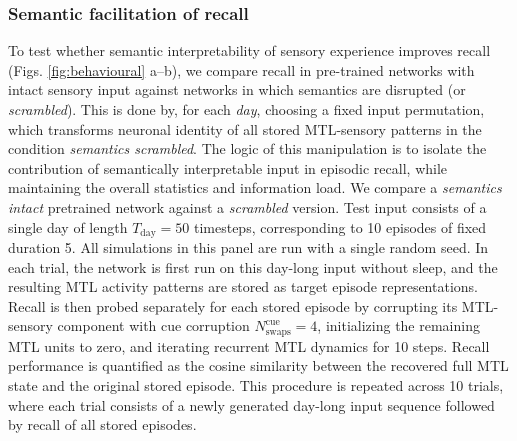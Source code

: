 \documentclass{article}
\begin{document}
\subsubsection*{Semantic facilitation of recall}
To test whether semantic interpretability of sensory experience improves recall   (Figs. \ref{fig:behavioural} a--b), we compare recall in pre-trained networks with intact sensory input against networks in which semantics are disrupted (or \textit{scrambled}). This is done by, for each \textit{day}, choosing a fixed input permutation, which transforms neuronal identity of all stored MTL-sensory patterns in the condition \textit{semantics scrambled}. The logic of this manipulation is to isolate the contribution of semantically interpretable input in episodic recall, while maintaining the overall statistics and information load.
\newline\newline
We compare a \emph{semantics intact} pretrained network against a \emph{scrambled} version. Test input consists of a single day of length $T_\mathrm{day}=50$ timesteps, corresponding to 10 episodes of fixed duration 5. All simulations in this panel are run with a single random seed.
\newline\newline
In each trial, the network is first run on this day-long input without sleep, and the resulting MTL activity patterns are stored as target episode representations. Recall is then probed separately for each stored episode by corrupting its MTL-sensory component with cue corruption $N^\textrm{cue}_\mathrm{swaps}=4$, initializing the remaining MTL units to zero, and iterating recurrent MTL dynamics for 10 steps. Recall performance is quantified as the cosine similarity between the recovered full MTL state and the original stored episode. This procedure is repeated across 10 trials, where each trial consists of a newly generated day-long input sequence followed by recall of all stored episodes.
\end{document}
